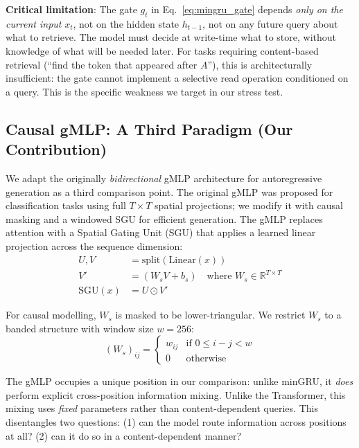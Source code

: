 \documentclass[10pt,a4paper]{article}
\begin{document}
\textbf{Critical limitation}: The gate $g_t$ in Eq.~\ref{eq:mingru_gate} depends \emph{only on the current input} $x_t$, not on the hidden state $h_{t-1}$, not on any future query about what to retrieve. The model must decide at write-time what to store, without knowledge of what will be needed later. For tasks requiring content-based retrieval (``find the token that appeared after $A$''), this is architecturally insufficient: the gate cannot implement a selective read operation conditioned on a query. This is the specific weakness we target in our stress test.

\subsection{Causal gMLP: A Third Paradigm (Our Contribution)}

We adapt the originally \emph{bidirectional} gMLP architecture \citep{liu2021pay} for autoregressive generation as a third comparison point. The original gMLP was proposed for classification tasks using full $T \times T$ spatial projections; we modify it with causal masking and a windowed SGU for efficient generation. The gMLP replaces attention with a Spatial Gating Unit (SGU) that applies a learned linear projection across the sequence dimension:
\begin{align}
    U, V &= \text{split}(\text{Linear}(x)) \\
    V' &= (W_s V + b_s) \quad \text{where } W_s \in \mathbb{R}^{T \times T} \\
    \text{SGU}(x) &= U \odot V'
\end{align}

For causal modelling, $W_s$ is masked to be lower-triangular. We restrict $W_s$ to a banded structure with window size $w = 256$:
\begin{equation}
    (W_s)_{ij} = \begin{cases} w_{ij} & \text{if } 0 \leq i - j < w \\ 0 & \text{otherwise} \end{cases}
\end{equation}

The gMLP occupies a unique position in our comparison: unlike minGRU, it \emph{does} perform explicit cross-position information mixing. Unlike the Transformer, this mixing uses \emph{fixed} parameters rather than content-dependent queries. This disentangles two questions: (1) can the model route information across positions at all? (2) can it do so in a content-dependent manner?
\end{document}
